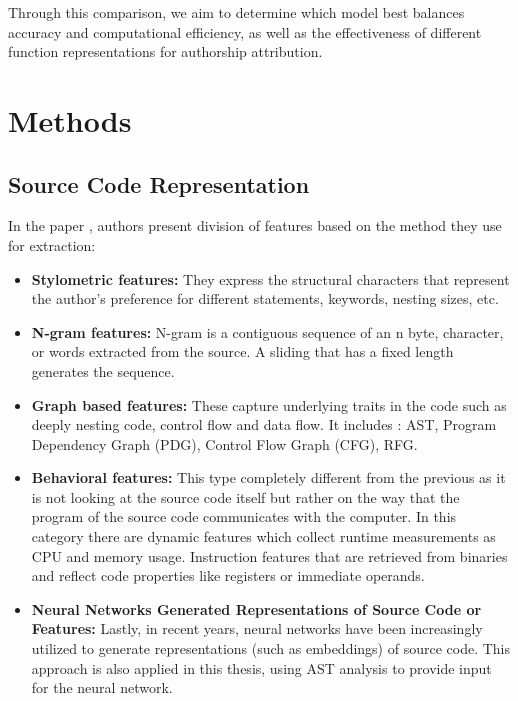 \documentclass[conference]{IEEEtran}
\begin{document}
Through this comparison, we aim to determine which model best balances 
accuracy and computational efficiency, as well as the effectiveness of 
different function representations for authorship attribution.

\section{Methods}

\subsection{Source Code Representation}

In the paper \cite{information}, authors present division of features based on the method they use for extraction: 
    
\begin{itemize}

    \item \textbf{Stylometric features:} 
    They express the structural characters that represent the author’s preference for different statements, keywords, nesting sizes, etc.
    \item \textbf{N-gram features:}
    N-gram is a contiguous sequence of an n byte, character, or words extracted from the source. A sliding that has a fixed length generates 
    the sequence.
    \item \textbf{Graph based features:}
    These capture underlying traits in the code such as deeply nesting code, control flow and data flow.
    It includes : AST, Program Dependency Graph (PDG), Control Flow Graph (CFG), RFG.
    \item \textbf{Behavioral features:}
    This type completely different from the previous as it is not looking at the source code itself
    but rather on the way that the program of the source code communicates with the computer.
    In this category there are dynamic features which collect runtime measurements as CPU and memory usage.
    Instruction features that are retrieved from binaries and reflect code properties like registers or immediate operands.
    \item \textbf{Neural Networks Generated Representations of Source Code or Features:}
    Lastly, in recent years, neural networks have been increasingly utilized 
    to generate representations (such as embeddings) of source code. This 
    approach is also applied in this thesis, using AST analysis to provide 
    input for the neural network.

\end{itemize}
\end{document}
